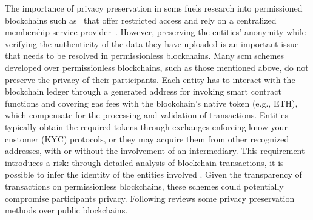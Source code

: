 \sloppy The importance of privacy preservation in \glspl{scm}  fuels research into permissioned blockchains such as~\cite{Basim2023Privacy, Li2024ProChain} that offer restricted access and rely on a centralized membership service provider~\cite{Fabric2018}. However, preserving the entities' anonymity while verifying the authenticity of the data they have uploaded is an important issue that needs to be resolved in permissionless blockchains. Many \gls{scm} schemes developed over permissionless blockchains, such as those mentioned above, do not preserve the privacy of their participants. Each entity has to interact with the blockchain ledger through a generated address for invoking smart contract functions and covering gas fees with the blockchain's native token (e.g., ETH), which compensate for the processing and validation of transactions. Entities typically obtain the required tokens through exchanges enforcing know your customer (KYC) protocols, or they may acquire them from other recognized addresses, with or without the involvement of an intermediary. This requirement introduces a risk: through detailed analysis of blockchain transactions, it is possible to infer the identity of the entities involved \cite{Victor2020Address, Zhou2022EthereumGraph}. Given the transparency of transactions on permissionless blockchains, these schemes could potentially compromise participants privacy.  Following reviews some privacy preservation methods over public blockchains.


